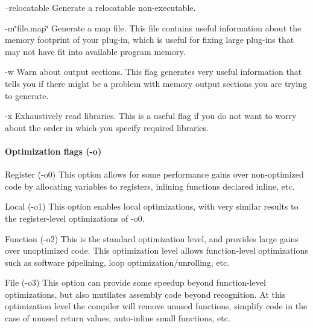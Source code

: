 \begin{DoxyItemize}
\item {\ttfamily –relocatable}  Generate a relocatable non-\/executable.  


\item {\ttfamily -\/m\char`\"{}file.\+map\char`\"{}}  Generate a map file. This file contains useful information about the memory footprint of your plug-\/in, which is useful for fixing large plug-\/ins that may not have fit into available program memory.  


\item {\ttfamily -\/w}  Warn about output sections. This flag generates very useful information that tells you if there might be a problem with memory output sections you are trying to generate.  


\item {\ttfamily -\/x}  Exhaustively read libraries. This is a useful flag if you do not want to worry about the order in which you specify required libraries.  


\end{DoxyItemize}

\hypertarget{a00832_subsubsection__optimization_flags_o_}{}\paragraph{Optimization flags (-\/o)}\label{a00832_subsubsection__optimization_flags_o_}
 
\begin{DoxyItemize}
\item Register ({\ttfamily -\/o0})  This option allows for some performance gains over non-\/optimized code by allocating variables to registers, inlining functions declared inline, etc.  


\item Local ({\ttfamily -\/o1})  This option enables local optimizations, with very similar results to the register-\/level optimizations of -\/o0.  


\item Function ({\ttfamily -\/o2})  This is the standard optimization level, and provides large gains over unoptimized code. This optimization level allows function-\/level optimizations such as software pipelining, loop optimization/unrolling, etc.  


\item File (-\/{\ttfamily o3})  This option can provide some speedup beyond function-\/level optimizations, but also mutilates assembly code beyond recognition. At this optimization level the compiler will remove unused functions, simplify code in the case of unused return values, auto-\/inline small functions, etc.  


\end{DoxyItemize}

